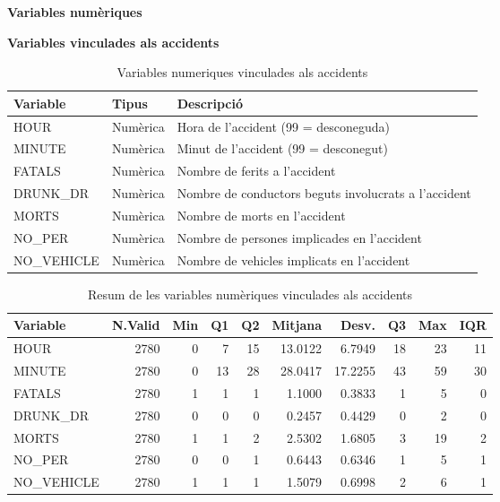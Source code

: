 \documentclass[11pt,longbibliography]{article}
\theoremstyle{definition}
\theoremstyle{remark}
\begin{document}
\begin{large}

\textbf{Variables numèriques}

\end{large}

\textbf{Variables vinculades als accidents}


\begin{table}[H]
\centering
\begin{tabular}{lll}
\hline
Variable    & Tipus    & Descripció                                           \\ \hline
HOUR        & Numèrica & Hora de l’accident (99 = desconeguda)                \\
MINUTE      & Numèrica & Minut de l’accident (99 = desconegut)                \\
FATALS      & Numèrica & Nombre de ferits a l’accident                        \\
DRUNK\_DR   & Numèrica & Nombre de conductors beguts involucrats a l’accident \\
MORTS       & Numèrica & Nombre de morts en l’accident                        \\
NO\_PER     & Numèrica & Nombre de persones implicades en l’accident          \\
NO\_VEHICLE & Numèrica & Nombre de vehicles implicats en l’accident           \\ \hline
\end{tabular}
\caption{Variables numeriques vinculades als accidents}
\label{tab:num-table}
\end{table}

\begin{table}[H]
\centering
\begin{tabular}{lrrrrrrrrr}
\hline
Variable    & N.Valid & Min & Q1 & Q2 & Mitjana    & Desv.  & Q3 & Max & IQR \\ \hline
HOUR        & 2780    & 0   & 7  & 15      & 13.0122 & 6.7949       & 18 & 23  & 11  \\ \hline
MINUTE      & 2780    & 0   & 13 & 28      & 28.0417 & 17.2255      & 43 & 59  & 30  \\ \hline
FATALS      & 2780    & 1   & 1  & 1       & 1.1000  & 0.3833       & 1  & 5   & 0   \\ \hline
DRUNK\_DR   & 2780    & 0   & 0  & 0       & 0.2457  & 0.4429       & 0  & 2   & 0   \\ \hline
MORTS       & 2780    & 1   & 1  & 2       & 2.5302  & 1.6805       & 3  & 19  & 2   \\ \hline
NO\_PER     & 2780    & 0   & 0  & 1       & 0.6443  & 0.6346       & 1  & 5   & 1   \\ \hline
NO\_VEHICLE & 2780    & 1   & 1  & 1       & 1.5079  & 0.6998       & 2  & 6   & 1   \\ \hline
\end{tabular}
\caption{Resum de les variables numèriques vinculades als accidents}
\label{tab:num2-table}
\end{table}
\end{document}

